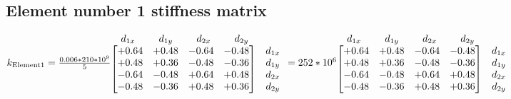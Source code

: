 \documentclass{article}
\begin{document}
\subsection{Element number 1 stiffness matrix}
    \begin{math}
        k_{\text{Element1}}=\frac{0.006*210*10^9}{5}
        \begin {matrix}
            \begin {matrix}
            \;d_{1x}&\;\;\;\;\;d_{1y}& \;\;\;\;\;d_{2x}&\;\;\;\;\;d_{2y}\\
            \end {matrix}\\
            \begin {bmatrix}
            +0.64&+0.48&-0.64&-0.48\\
            +0.48&+0.36&-0.48&-0.36\\
            -0.64&-0.48&+0.64&+0.48\\
            -0.48&-0.36&+0.48&+0.36\\
            \end{bmatrix}&
            \begin{matrix}
            d_{1x}\\
            d_{1y}\\
            d_{2x}\\
            d_{2y}\\
            \end{matrix}
        \end{matrix}
        \newline
        =252*10^6
        \begin {matrix}
            \begin {matrix}
            \;d_{1x}&\;\;\;\;\;d_{1y}& \;\;\;\;\;d_{2x}&\;\;\;\;\;d_{2y}\\
            \end {matrix}\\
            \begin {bmatrix}
            +0.64&+0.48&-0.64&-0.48\\
            +0.48&+0.36&-0.48&-0.36\\
            -0.64&-0.48&+0.64&+0.48\\
            -0.48&-0.36&+0.48&+0.36\\
            \end{bmatrix}&
            \begin{matrix}
            d_{1x}\\
            d_{1y}\\
            d_{2x}\\
            d_{2y}\\
            \end{matrix}
        \end{matrix}
    \end{math}
\end{document}

